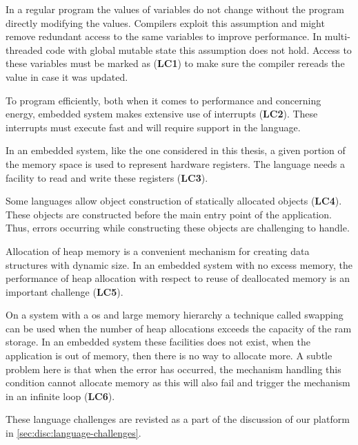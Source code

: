In a regular program the values of variables do not change without the program directly modifying the values.
Compilers exploit this assumption and might remove redundant access to the same variables to improve performance.
In multi-threaded code with global mutable state this assumption does not hold.
Access to these variables must be marked as  (\textbf{LC1}) to make sure the compiler rereads the value in case it was updated.

To program efficiently, both when it comes to performance and concerning energy, embedded system makes extensive use of interrupts (\textbf{LC2}).
These interrupts must execute fast and will require support in the language.

In an embedded system, like the one considered in this thesis, a given portion of the memory space is used to represent hardware registers.
The language needs a facility to read and write these registers (\textbf{LC3}).

Some languages allow object construction of statically allocated objects (\textbf{LC4}).
These objects are constructed before the main entry point of the application.
Thus, errors occurring while constructing these objects are challenging to handle.

Allocation of heap memory is a convenient mechanism for creating data structures with dynamic size.
In an embedded system with no excess memory, the performance of heap allocation with respect to reuse of deallocated memory is an important challenge (\textbf{LC5}).

On a system with a \gls{os} and large memory hierarchy a technique called swapping can be used when the number of heap allocations exceeds the capacity of the \gls{ram} storage.
In an embedded system these facilities does not exist, when the application is out of memory, then there is no way to allocate more.
A subtle problem here is that when the error has occurred, the mechanism handling this condition cannot allocate memory as this will also fail and trigger the mechanism in an infinite loop (\textbf{LC6}).

These language challenges are revisted as a part of the discussion of our platform in \autoref{sec:disc:language-challenges}.
